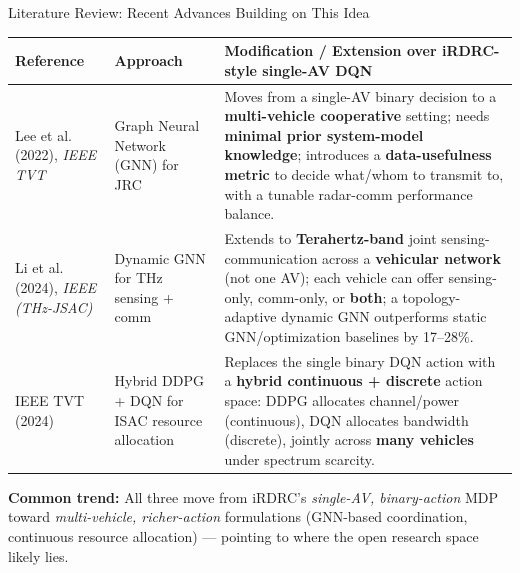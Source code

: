 \documentclass[aspectratio=169]{beamer}
\begin{document}
\begin{frame}{Literature Review: Recent Advances Building on This Idea}
  \tiny
  \begin{tabular}{p{2.6cm}p{2.6cm}p{6.3cm}}
    \toprule
    \textbf{Reference} & \textbf{Approach} & \textbf{Modification / Extension over iRDRC-style single-AV DQN} \\
    \midrule
    Lee et al. (2022), \textit{IEEE TVT} & Graph Neural Network (GNN) for JRC & Moves from a single-AV binary decision to a \textbf{multi-vehicle cooperative} setting; needs \textbf{minimal prior system-model knowledge}; introduces a \textbf{data-usefulness metric} to decide what/whom to transmit to, with a tunable radar-comm performance balance. \\
    \addlinespace
    Li et al. (2024), \textit{IEEE (THz-JSAC)} & Dynamic GNN for THz sensing + comm & Extends to \textbf{Terahertz-band} joint sensing-communication across a \textbf{vehicular network} (not one AV); each vehicle can offer sensing-only, comm-only, or \textbf{both}; a topology-adaptive dynamic GNN outperforms static GNN/optimization baselines by 17--28\%. \\
    \addlinespace
    IEEE TVT (2024) & Hybrid DDPG + DQN for ISAC resource allocation & Replaces the single binary DQN action with a \textbf{hybrid continuous + discrete} action space: DDPG allocates channel/power (continuous), DQN allocates bandwidth (discrete), jointly across \textbf{many vehicles} under spectrum scarcity. \\
    \bottomrule
  \end{tabular}

  \vspace{0.2cm}
  \small\textbf{Common trend:} All three move from iRDRC's \emph{single-AV, binary-action} MDP toward \emph{multi-vehicle, richer-action} formulations (GNN-based coordination, continuous resource allocation) --- pointing to where the open research space likely lies.
\end{frame}

\end{document}
